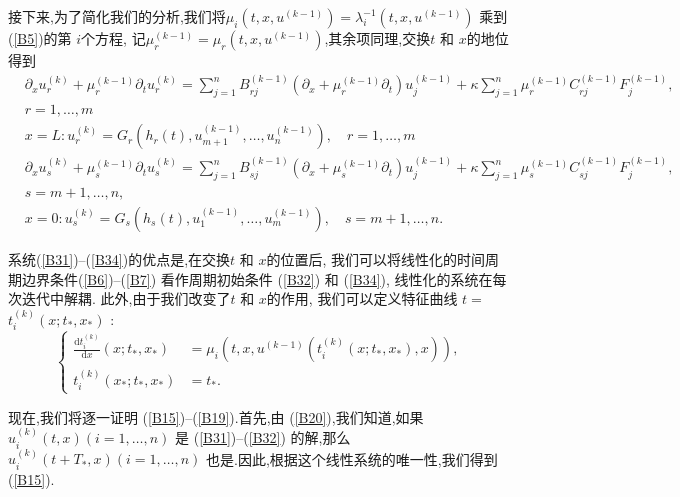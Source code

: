 \documentclass[notitlepage,cs4size,punct,oneside]{ctexrep}
\numberwithin{equation}{chapter}
\theoremstyle{mystyle}
\begin{document}
接下来,为了简化我们的分析,我们将$\mu_{i}\left(t,x,u^{(k-1)}\right)=\lambda_{i}^{-1}\left(t,x,u^{(k-1)}\right)$ 乘到(\ref{B5})的第 $i$个方程, 记$\mu_{r}^{(k-1)}=\mu_{r}\left( t,x,u^{(k-1)} \right)$,其余项同理,交换$t$ 和 $x$的地位得到
\begin{align}
     & \partial_{x} u_{r}^{(k)}+\mu_{r}^{(k-1)} \partial_{t} u_{r}^{(k)}=\sum_{j=1}^{n} B_{r j}^{(k-1)}\left(\partial_{x}+\mu_{r}^{(k-1)} \partial_{t}\right) u_{j}^{(k-1)} + \kappa \sum_{j=1}^{n}\mu_{r}^{(k-1)} C_{r j}^{(k-1)} F_j^{(k-1)},\nonumber \\& r=1, \ldots, m  \label{B31} \\
     & x=L: u_{r}^{(k)}=G_{r}\left(h_{r}(t), u_{m+1}^{(k-1)}, \ldots, u_{n}^{(k-1)}\right), \quad r=1, \ldots, m  \label{B32}                                                                                                                            \\
     & \partial_{x} u_{s}^{(k)}+\mu_{s}^{(k-1)} \partial_{t} u_{s}^{(k)}=\sum_{j=1}^{n} B_{s j}^{(k-1)}\left(\partial_{x}+\mu_{s}^{(k-1)} \partial_{t}\right) u_{j}^{(k-1)} + \kappa \sum_{j=1}^{n}\mu_{s}^{(k-1)} C_{s j}^{(k-1)} F_j^{(k-1)},\nonumber \\& s=m+1, \ldots, n,  \label{B33} \\
     & x=0: u_{s}^{(k)}=G_{s}\left(h_{s}(t), u_{1}^{(k-1)}, \ldots, u_{m}^{(k-1)}\right), \quad s=m+1, \ldots, n . \label{B34}
\end{align}

系统(\ref{B31})--(\ref{B34})的优点是,在交换$t$ 和 $x$的位置后, 我们可以将线性化的时间周期边界条件(\ref{B6})--(\ref{B7}) 看作周期初始条件 (\ref{B32}) 和 (\ref{B34}), 线性化的系统在每次迭代中解耦.
此外,由于我们改变了$t$ 和 $x$的作用, 我们可以定义特征曲线 $t=$ $t_{i}^{(k)}\left(x ; t_{*}, x_{*}\right)$ :
\begin{equation} \label{B35}
    \left\{\begin{aligned}
        \frac{\mathrm{d} t_{i}^{(k)}}{\mathrm{d} x}\left(x ; t_{*}, x_{*}\right) & =\mu_{i}\left(t,x,u^{(k-1)}\left(t_{i}^{(k)}\left(x ; t_{*}, x_{*}\right), x\right)\right), \\
        t_{i}^{(k)}\left(x_{*} ; t_{*}, x_{*}\right)                             & =t_{*} .
    \end{aligned}\right.
\end{equation}

现在,我们将逐一证明 (\ref{B15})--(\ref{B19}).首先,由 (\ref{B20}),我们知道,如果 $u_{i}^{(k)}(t, x) (i = 1, \ldots, n)$ 是 (\ref{B31})--(\ref{B32}) 的解,那么 $u_{i}^{(k)}\left(t + T_{*}, x\right) (i = 1, \ldots, n)$ 也是.因此,根据这个线性系统的唯一性,我们得到 (\ref{B15}).
\end{document}
